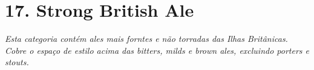 \section*{17. Strong British Ale}
\textit{Esta categoria contém ales mais forntes e não torradas das Ilhas Britânicas. Cobre o espaço de estilo acima das bitters, milds e brown ales, excluindo porters e stouts.}
